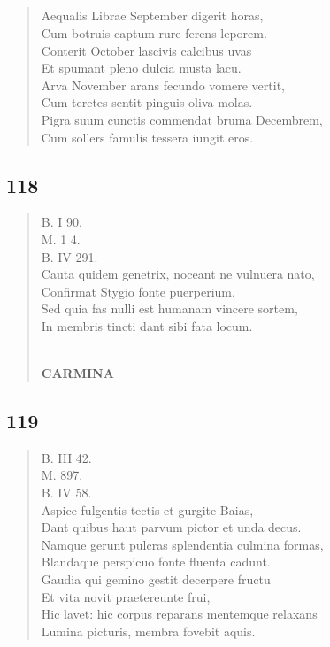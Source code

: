 \documentclass[11pt, a4paper]{report}
\begin{document}
            \subsection*{}
      \begin{verse}
      Aequalis Librae September digerit horas, \\ Cum botruis captum rure ferens leporem. \\ Conterit October lascivis calcibus uvas \\ Et spumant pleno dulcia musta lacu. \\ Arva November arans fecundo vomere vertit, \\ Cum teretes sentit pinguis oliva molas. \\ Pigra suum cunctis commendat bruma Decembrem, \\ Cum sollers famulis tessera iungit eros. \\ 
      \end{verse}
  
            \subsection*{118}
      \begin{verse}
      B. I 90. \\ M. 1 4. \\ B. IV 291. \\ Cauta quidem genetrix, noceant ne vulnuera nato, \\ Confirmat Stygio fonte puerperium. \\ Sed quia fas nulli est humanam vincere sortem, \\ In membris tincti dant sibi fata locum. \\ 
        ﻿\pagebreak 
    \begin{center} \textbf{CARMINA} \end{center} \marginpar{[134]} 
      \end{verse}
  
            \subsection*{119}
      \begin{verse}
      B. III 42. \\ M. 897. \\ B. IV 58. \\ Aspice fulgentis tectis et gurgite Baias, \\ Dant quibus haut parvum pictor et unda decus. \\ Namque gerunt pulcras splendentia culmina formas, \\ Blandaque perspicuo fonte fluenta cadunt. \\ Gaudia qui gemino gestit decerpere fructu \\ Et vita novit praetereunte frui, \\ Hic lavet: hic corpus reparans mentemque relaxans \\ Lumina picturis, membra fovebit aquis. \\ 
      \end{verse}
  
\end{document}

